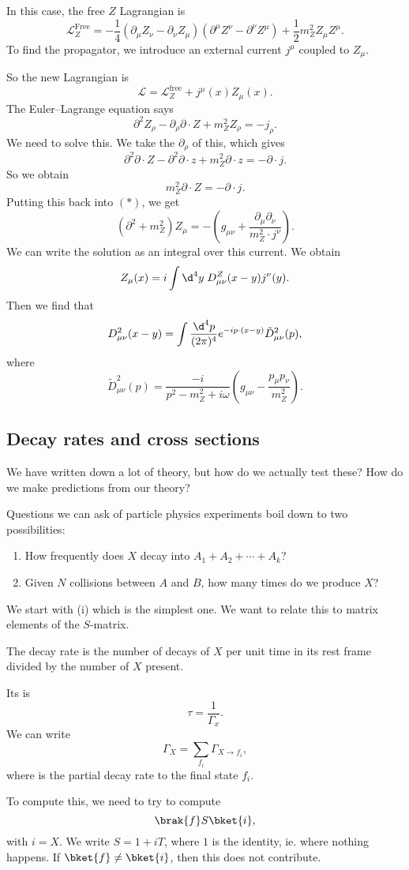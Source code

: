 \documentclass[a4paper]{article}
\begin{document}
In this case, the free $Z$ Lagrangian is
\[
  \mathcal{L}^{\mathrm{Free}}_Z = - \frac{1}{4}(\partial_\mu Z_\nu - \partial_\nu Z_\mu) (\partial^\mu Z^\nu - \partial^\nu Z^\mu) + \frac{1}{2} m_Z^2 Z_\mu Z^\mu.
\]
To find the propagator, we introduce an external current $j^\mu$ coupled to $Z_\mu$.

So the new Lagrangian is
\[
  \mathcal{L} = \mathcal{L}_Z^{\mathrm{free}} + j^\mu (x) Z_\mu(x).
\]
The Euler--Lagrange equation says
\[
  \partial^2 Z_\rho - \partial_\rho \partial \cdot Z + m_Z^2 Z_\rho = -j_\rho.\tag{$*$}
\]
We need to solve this. We take the $\partial_\rho$ of this, which gives
\[
  \partial^2 \partial\cdot Z - \partial^2 \partial \cdot z + m_Z^2 \partial \cdot z =- \partial \cdot j.
\]
So we obtain
\[
  m_Z^2 \partial \cdot Z = - \partial \cdot j.
\]
Putting this back into $(*)$, we get
\[
  (\partial^2 + m_Z^2) Z_\mu = - \left(g_{\mu\nu} + \frac{\partial_\mu\partial_\nu}{m_Z^2 \cdot j^\nu}\right).
\]
We can write the solution as an integral over this current. We obtain
\[
  Z_\mu(x) = i \int \d^4 y\; D_{\mu\nu}^Z(x - y)j^\nu(y).
\]
Then we find that
\[
  D_{\mu\nu}^2 (x - y) = \int \frac{\d^4 p}{(2\pi)^4} e^{-ip\cdot (x - y)} \tilde{D}_{\mu\nu}^2(p),
\]
where
\[
  \tilde{D}_{\mu\nu}^2(p) = \frac{-i}{p^2 - m_Z^2 + i \omega}\left(g_{\mu\nu} - \frac{p_\mu p_\nu}{m_Z^2}\right).
\]
\subsection{Decay rates and cross sections}
We have written down a lot of theory, but how do we actually test these? How do we make predictions from our theory?

Questions we can ask of particle physics experiments boil down to two possibilities:
\begin{enumerate}
  \item How frequently does $X$ decay into $A_1 + A_2 + \cdots + A_k$?
  \item Given $N$ collisions between $A$ and $B$, how many times do we produce $X$?
\end{enumerate}
We start with (i) which is the simplest one. We want to relate this to matrix elements of the $S$-matrix.

\begin{defi}
  The decay rate  is the number of decays of $X$ per unit time in its rest frame divided by the number of $X$ present.

  Its  is
  \[
    \tau = \frac{1}{\Gamma_x}.
  \]
  We can write
  \[
    \Gamma_X = \sum_{f_i} \Gamma_{X \to f_i},
  \]
  where  is the partial decay rate to the final state $f_i$.
\end{defi}
To compute this, we need to try to compute
\[
  \brak{f} S\bket{i},
\]
with $i = X$. We write $S = 1 + iT$, where $1$ is the identity, ie. where nothing happens. If $\bket{f} \not= \bket{i}$, then this does not contribute.
\end{document}
